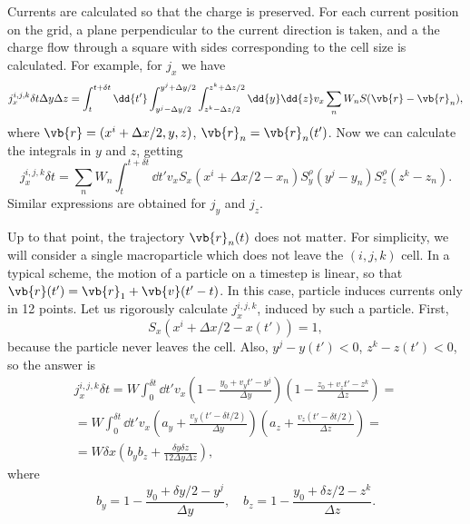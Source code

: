 \documentclass[12pt,a4paper,DIV=calc]{scrartcl}
\begin{document}
Currents are calculated so that the charge is preserved.
For each current position on the grid, a plane perpendicular to the current direction is taken, and a the charge flow through a square with sides corresponding to the cell size is calculated.
For example, for $j_x$ we have
\begin{equation}
    j_x^{i,j,k} \delta t \Delta y \Delta z = \int_t^{t+\delta t} \dd{t'} \int_{y^j-\Delta y/2}^{y^j + \Delta y /2}\int_{z^k-\Delta z/2}^{z^k + \Delta z /2} \dd{y}\dd{z} v_x \sum_n W_n S(\vb{r}-\vb{r}_n),
\end{equation}
where $\vb{r} = (x^i+\Delta x /2, y, z)$, $\vb{r}_n = \vb{r}_n(t')$.
Now we can calculate the integrals in $y$ and $z$, getting
\begin{equation}
    j_x^{i,j,k} \delta t = \sum_n W_n \int_t^{t+\delta t} \dd{t'} v_x S_x(x^i + \Delta x/2 - x_n) S^\rho_y(y^j - y_n) S^\rho_z(z^k - z_n).
\end{equation}
Similar expressions are obtained for $j_y$ and $j_z$.

Up to that point, the trajectory $\vb{r}_n(t)$ does not matter.
For simplicity, we will consider a single macroparticle which does not leave the $(i,j,k)$ cell.
In a typical scheme, the motion of a particle on a timestep is linear, so that $\vb{r}(t') = \vb{r}_1 + \vb{v} (t'-t)$.
In this case, particle induces currents only in 12 points.
Let us rigorously calculate $j_x^{i,j,k}$, induced by such a particle.
First, 
\begin{equation}
    S_x(x^i + \Delta x/2 - x(t')) = 1,
\end{equation}
because the particle never leaves the cell.
Also, $y^j - y(t') < 0$, $z^k - z(t') < 0$, so the answer is
\begin{multline}
    j_x^{i,j,k} \delta t = W \int_0^{\delta t} \dd{t'} v_x \left(1 - \frac{y_0+v_y t' - y^j}{\Delta y}\right)\left(1 - \frac{z_0+v_z t' - z^k}{\Delta z}\right) = \\
    = W \int_0^{\delta t}\dd{t'} v_x \left(a_y + \frac{v_y (t'-\delta t/2)}{\Delta y}\right)\left(a_z + \frac{v_z (t'-\delta t/2)}{\Delta z}\right) = \\
    = W \delta x \left( b_y b_z + \frac{\delta y\delta z}{12\Delta y \Delta z}\right),
\end{multline}
where 
\begin{equation}
    b_y = 1 - \frac{y_0 + \delta y / 2 - y^j}{\Delta y},\quad b_z = 1 - \frac{y_0 + \delta z / 2 - z^k}{\Delta z}.
\end{equation}
\end{document}

